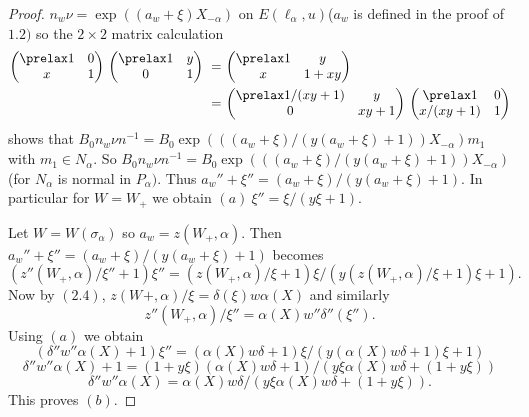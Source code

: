 \documentclass{memo-l}
\theoremstyle{definition}
\theoremstyle{remark}
\numberwithin{section}{chapter}
\numberwithin{equation}{chapter}
\begin{document}
\begin{proof}   $n_{w}{\nu} = \exp((a_{w}+{\xi})X_{-{\alpha}})$ on
$E({\ell}_{{\alpha}},u)$\quad ($a_{w}$ is defined in the proof of $1.2)$ so the $2
\times 2$ matrix calculation
$$\aligned
{\begin{pmatrix} \prelax  1 & 0 \\ x & 1 \end{pmatrix}}\ {\begin{pmatrix} \prelax  1 & y \\ 0 & 1 \end{pmatrix}}\
=&\ {\begin{pmatrix} \prelax
 1 & y \\ x & 1+xy \end{pmatrix}}\\
=&\
{\begin{pmatrix} \prelax
 1/(xy+1) & y \\ 0 & xy + 1 \end{pmatrix}}\
{\begin{pmatrix} \prelax
 1 & 0 \\ x/(xy+1) & 1 \end{pmatrix}}
\endaligned$$
shows that $B_{0}n_{w}{\nu}n^{-1} =
B_{0}\exp(((a_{w}+{\xi})/(y(a_{w}+{\xi})+1))X_{-{\alpha}})m_{1}$ with $m_{1}
 \in  N_{{\alpha}}$.  So $B_{0}n_{w}{\nu}n^{-1} =
B_{0}\exp(((a_{w}+{\xi})/(y(a_{w}+{\xi})+1))X_{-{\alpha}})$ (for
$N_{{\alpha}}$ is normal in $P_{{\alpha}})$.  Thus $a_{w}''+{\xi}'' =
(a_{w}+{\xi})/(y(a_{w}+{\xi})+1)$.  In particular for $W = W_{+}$ we obtain
$(a)\  {\xi}'' = {\xi}/(y{\xi}+1)$.

   Let $W = W({\sigma}_{{\alpha}})$ so $a_{w} = z(W_{+},{\alpha})$.  Then
$a_{w}''+{\xi}'' = (a_{w}+{\xi})/(y(a_{w}+{\xi})+1)$ becomes
$$
(z''(W_{+},{\alpha})/{\xi}'' + 1){\xi''} = (z(W_{+},{\alpha})/{\xi} +
1){\xi}/(y(z(W_{+},{\alpha})/{\xi}+1){\xi} + 1) .
$$
Now by $(2.4)$, $z(W_{}+,{\alpha})/{\xi} = {\delta}({\xi})w{\alpha}(X)$ and
similarly $$z''(W_{+},{\alpha})/{\xi}'' = {\alpha}(X)w''{\delta}''({\xi}'').$$  Using
$(a)$ we obtain
$$
({\delta}''w''{\alpha}(X) + 1){\xi}'' =
({\alpha}(X)w{\delta}+1){\xi}/(y({\alpha}(X)w{\delta}+1){\xi}+1)
$$
$$
{\delta}''w''{\alpha}(X) +1 =
(1+y{\xi})({\alpha}(X)w{\delta}+1)/(y{\xi}{\alpha}(X)w{\delta}+(1+y{\xi}))
$$
$$
{\delta}''w''{\alpha}(X) =
{\alpha}(X)w{\delta}/(y{\xi}{\alpha}(X)w{\delta}+(1+y{\xi})).
$$
This proves $(b)$.


\end{proof}
\end{document}

